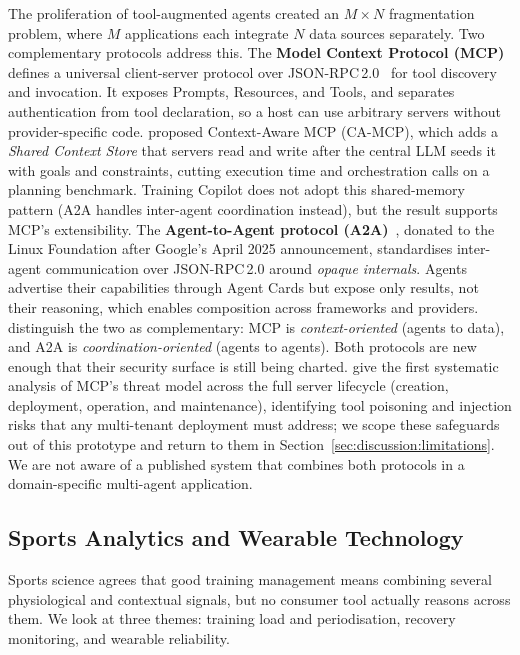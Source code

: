 The proliferation of tool-augmented agents created an $M \times N$ fragmentation problem, where $M$ applications each integrate $N$ data sources separately. Two complementary protocols address this. The \textbf{Model Context Protocol (MCP)}~\citep{anthropic_mcp_2024, anthropic_mcp_announcement_2024} defines a universal client-server protocol over JSON-RPC\,2.0~\citep{jsonrpc_spec_2013} for tool discovery and invocation. It exposes Prompts, Resources, and Tools, and separates authentication from tool declaration, so a host can use arbitrary servers without provider-specific code. \cite{jayanti_enhancing_2026} proposed Context-Aware MCP (CA-MCP), which adds a \textit{Shared Context Store} that servers read and write after the central LLM seeds it with goals and constraints, cutting execution time and orchestration calls on a planning benchmark. Training Copilot does not adopt this shared-memory pattern (A2A handles inter-agent coordination instead), but the result supports MCP's extensibility. The \textbf{Agent-to-Agent protocol (A2A)}~\citep{google_a2a_2025}, donated to the Linux Foundation after Google's April 2025 announcement, standardises inter-agent communication over JSON-RPC\,2.0 around \textit{opaque internals}. Agents advertise their capabilities through Agent Cards but expose only results, not their reasoning, which enables composition across frameworks and providers. \cite{yang_survey_2025} distinguish the two as complementary: MCP is \textit{context-oriented} (agents to data), and A2A is \textit{coordination-oriented} (agents to agents). Both protocols are new enough that their security surface is still being charted. \cite{hou_mcp_2025} give the first systematic analysis of MCP's threat model across the full server lifecycle (creation, deployment, operation, and maintenance), identifying tool poisoning and injection risks that any multi-tenant deployment must address; we scope these safeguards out of this prototype and return to them in Section~\ref{sec:discussion:limitations}. We are not aware of a published system that combines both protocols in a domain-specific multi-agent application.

\subsection{Sports Analytics and Wearable Technology}\label{sec:sota:sports}

Sports science agrees that good training management means combining several physiological and contextual signals, but no consumer tool actually reasons across them. We look at three themes: training load and periodisation, recovery monitoring, and wearable reliability.

